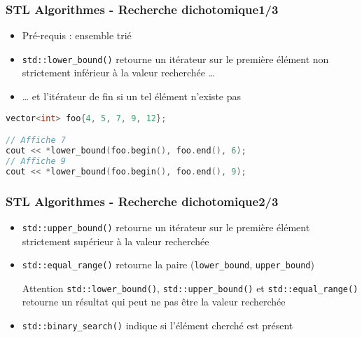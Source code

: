 \documentclass[C++.tex]{subfiles}
\begin{document}
\begin{frame}[fragile]
	\frametitle{STL Algorithmes - Recherche dichotomique\titlehfill{}1/3}
	\begin{itemize}
		\item Pré-requis : ensemble trié
		\item \lstinline|std::lower_bound()| retourne un itérateur sur le première élément non strictement inférieur à la valeur recherchée \ldots


		\item \ldots{} et l'itérateur de fin si un tel élément n'existe pas
	\end{itemize}

	\begin{lstlisting}[language=C++]
vector<int> foo{4, 5, 7, 9, 12};

// Affiche 7
cout << *lower_bound(foo.begin(), foo.end(), 6);
// Affiche 9
cout << *lower_bound(foo.begin(), foo.end(), 9);\end{lstlisting}
\end{frame}

\begin{frame}[fragile]
	\frametitle{STL Algorithmes - Recherche dichotomique\titlehfill{}2/3}
	\begin{itemize}
		\item \lstinline|std::upper_bound()| retourne un itérateur sur le première élément strictement supérieur à la valeur recherchée 
		\item \lstinline|std::equal_range()| retourne la paire (\lstinline|lower_bound|, \lstinline|upper_bound|)

		\begin{alertblock}{Attention}
			\lstinline|std::lower_bound()|, \lstinline|std::upper_bound()| et \lstinline|std::equal_range()| retourne un résultat qui peut ne pas être la valeur recherchée
		\end{alertblock}

		\item \lstinline|std::binary_search()| indique si l'élément cherché est présent
	\end{itemize}
\end{frame}
\end{document}
